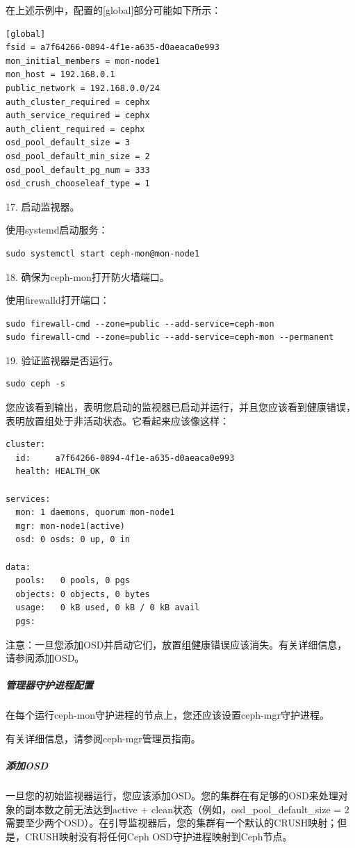 \documentclass[12pt,UTF8]{ctexbook}
\begin{document}
在上述示例中，配置的[global]部分可能如下所示：
\begin{verbatim}
[global]
fsid = a7f64266-0894-4f1e-a635-d0aeaca0e993
mon_initial_members = mon-node1
mon_host = 192.168.0.1
public_network = 192.168.0.0/24
auth_cluster_required = cephx
auth_service_required = cephx
auth_client_required = cephx
osd_pool_default_size = 3
osd_pool_default_min_size = 2
osd_pool_default_pg_num = 333
osd_crush_chooseleaf_type = 1
\end{verbatim}

17. 启动监视器。

使用systemd启动服务：
\begin{verbatim}
sudo systemctl start ceph-mon@mon-node1
\end{verbatim}

18. 确保为ceph-mon打开防火墙端口。

使用firewalld打开端口：
\begin{verbatim}
sudo firewall-cmd --zone=public --add-service=ceph-mon
sudo firewall-cmd --zone=public --add-service=ceph-mon --permanent
\end{verbatim}

19. 验证监视器是否运行。
\begin{verbatim}
sudo ceph -s
\end{verbatim}

您应该看到输出，表明您启动的监视器已启动并运行，并且您应该看到健康错误，表明放置组处于非活动状态。它看起来应该像这样：
\begin{verbatim}
cluster:
  id:     a7f64266-0894-4f1e-a635-d0aeaca0e993
  health: HEALTH_OK

services:
  mon: 1 daemons, quorum mon-node1
  mgr: mon-node1(active)
  osd: 0 osds: 0 up, 0 in

data:
  pools:   0 pools, 0 pgs
  objects: 0 objects, 0 bytes
  usage:   0 kB used, 0 kB / 0 kB avail
  pgs:
\end{verbatim}

注意：一旦您添加OSD并启动它们，放置组健康错误应该消失。有关详细信息，请参阅添加OSD。

\subparagraph{管理器守护进程配置}
在每个运行ceph-mon守护进程的节点上，您还应该设置ceph-mgr守护进程。

有关详细信息，请参阅ceph-mgr管理员指南。

\subparagraph{添加OSD}
一旦您的初始监视器运行，您应该添加OSD。您的集群在有足够的OSD来处理对象的副本数之前无法达到active + clean状态（例如，osd_pool_default_size = 2需要至少两个OSD）。在引导监视器后，您的集群有一个默认的CRUSH映射；但是，CRUSH映射没有将任何Ceph OSD守护进程映射到Ceph节点。
\end{document}

